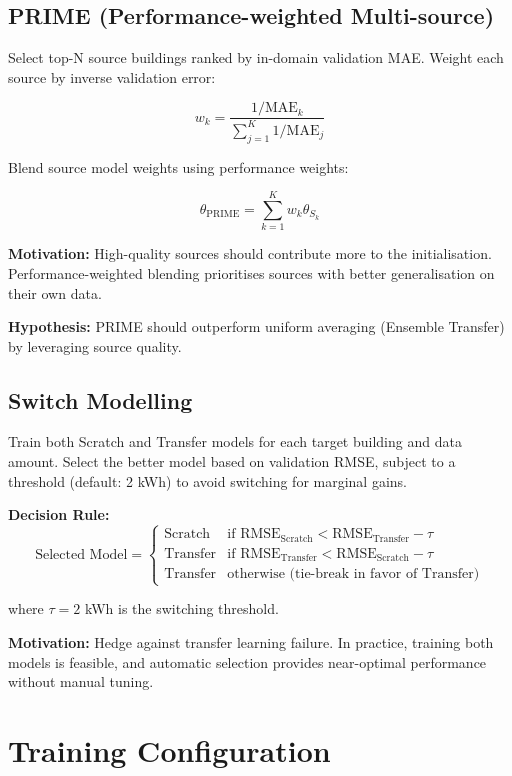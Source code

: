 \documentclass[12pt,a4paper]{report}
\begin{document}
\subsection{PRIME (Performance-weighted Multi-source)}

Select top-N source buildings ranked by in-domain validation MAE. Weight each source by inverse validation error:

\[
w_k = \frac{1/\text{MAE}_k}{\sum_{j=1}^{K} 1/\text{MAE}_j}
\]

Blend source model weights using performance weights:

\[
\theta_{\text{PRIME}} = \sum_{k=1}^{K} w_k \theta_{S_k}
\]

\textbf{Motivation:} High-quality sources should contribute more to the initialisation. Performance-weighted blending prioritises sources with better generalisation on their own data.

\textbf{Hypothesis:} PRIME should outperform uniform averaging (Ensemble Transfer) by leveraging source quality.

\subsection{Switch Modelling}

Train both Scratch and Transfer models for each target building and data amount. Select the better model based on validation RMSE, subject to a threshold (default: 2 kWh) to avoid switching for marginal gains.

\textbf{Decision Rule:}
\[
\text{Selected Model} = 
\begin{cases}
\text{Scratch} & \text{if } \text{RMSE}_{\text{Scratch}} < \text{RMSE}_{\text{Transfer}} - \tau \\
\text{Transfer} & \text{if } \text{RMSE}_{\text{Transfer}} < \text{RMSE}_{\text{Scratch}} - \tau \\
\text{Transfer} & \text{otherwise (tie-break in favor of Transfer)}
\end{cases}
\]

where \(\tau = 2\) kWh is the switching threshold.

\textbf{Motivation:} Hedge against transfer learning failure. In practice, training both models is feasible, and automatic selection provides near-optimal performance without manual tuning.

\section{Training Configuration}
\end{document}

